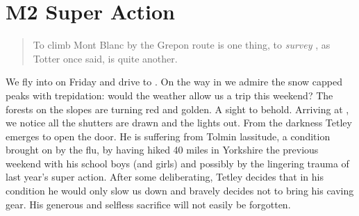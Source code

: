 \section{M2 Super Action}



\begin{verse}
To climb Mont Blanc by the Grepon route is one thing, to \textit{survey }, as Totter once said, is quite another.
\end{verse}

We fly into  on Friday and drive to . On the way in we
admire the snow capped peaks with trepidation: would the weather allow
us a trip this weekend? The forests on the slopes are turning red and
golden. A sight to behold. Arriving at , we notice all the
shutters are drawn and the lights out. From the darkness Tetley emerges
to open the door. He is suffering from Tolmin lassitude, a condition
brought on by the flu, by having hiked 40 miles in Yorkshire the
previous weekend with his school boys (and girls) and possibly by the
lingering trauma of last year's super action. After some deliberating,
Tetley decides that in his condition he would only slow us down and
bravely decides not to bring his caving gear. His generous and selfless
sacrifice will not easily be forgotten.

